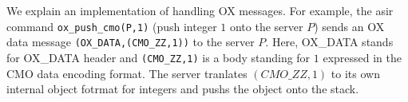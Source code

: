 We explain an implementation of handling OX messages.
For example, the asir command {\tt ox\_push\_cmo(P,1)}
(push integer $1$ onto the server $P$)
sends an OX data message
{\tt (OX\_DATA,(CMO\_ZZ,1))} to the server $P$.
Here,
OX\_DATA stands for OX\_DATA header and 
{\tt (CMO\_ZZ,1)} is a body standing for $1$ expressed 
in the CMO data encoding format.
The server tranlates $(CMO\_ZZ, 1)$ to its own internal object fotrmat
for integers and pushs the object onto the stack.

%
